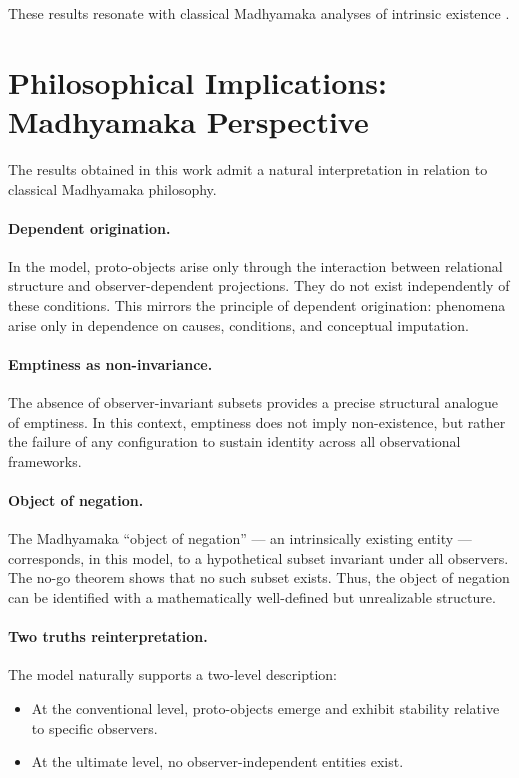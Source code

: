 \documentclass[11pt]{article}
\begin{document}
These results resonate with classical Madhyamaka analyses of intrinsic existence \cite{nagarjuna, tsongkhapa}.

\section{Philosophical Implications: Madhyamaka Perspective}

The results obtained in this work admit a natural interpretation in relation to classical Madhyamaka philosophy.

\paragraph{Dependent origination.}
In the model, proto-objects arise only through the interaction between relational structure and observer-dependent projections. They do not exist independently of these conditions. This mirrors the principle of dependent origination: phenomena arise only in dependence on causes, conditions, and conceptual imputation.

\paragraph{Emptiness as non-invariance.}
The absence of observer-invariant subsets provides a precise structural analogue of emptiness. In this context, emptiness does not imply non-existence, but rather the failure of any configuration to sustain identity across all observational frameworks.

\paragraph{Object of negation.}
The Madhyamaka ``object of negation'' --- an intrinsically existing entity --- corresponds, in this model, to a hypothetical subset invariant under all observers. The no-go theorem shows that no such subset exists. Thus, the object of negation can be identified with a mathematically well-defined but unrealizable structure.

\paragraph{Two truths reinterpretation.}
The model naturally supports a two-level description:
\begin{itemize}
    \item At the conventional level, proto-objects emerge and exhibit stability relative to specific observers.
    \item At the ultimate level, no observer-independent entities exist.
\end{itemize}
\end{document}

